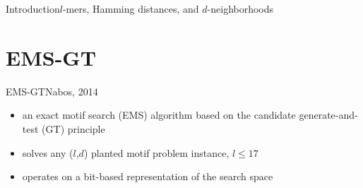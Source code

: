 \documentclass[pdf,xcolor={dvipsnames}]{beamer}
\begin{document}
\begin{frame}{Introduction}{$l$-mers, Hamming distances, and $d$-neighborhoods}
\begin{itemize}
		\end{itemize}
		\end{frame}

\section{EMS-GT}
	\begin{frame}{EMS-GT}{Nabos, 2014}
		\begin{itemize}
		\item an exact motif search (EMS) algorithm based on the candidate generate-and-test (GT) principle\newline
		\item solves any ($l$,$d$) planted motif problem instance, $l \leq 17$ \newline
		\item operates on a bit-based representation of the search space
		\end{itemize}
		\end{frame}
\end{document}
